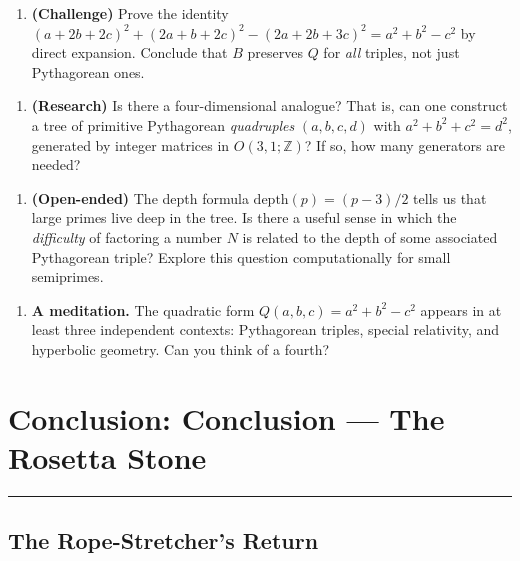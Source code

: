 \documentclass[11pt,openany]{book}
\theoremstyle{definition}
\theoremstyle{plain}
\theoremstyle{remark}
\begin{document}
\begin{enumerate}
\item \textbf{ (Challenge)} Prove the identity $(a + 2b + 2c)^2 + (2a + b + 2c)^2 - (2a + 2b + 3c)^2 = a^2 + b^2 - c^2$ by direct expansion. Conclude that $B$ preserves $Q$ for \textit{all} triples, not just Pythagorean ones.
\end{enumerate}

\begin{enumerate}
\item \textbf{ (Research)} Is there a four-dimensional analogue? That is, can one construct a tree of primitive Pythagorean \textit{quadruples} $(a, b, c, d)$ with $a^2 + b^2 + c^2 = d^2$, generated by integer matrices in $O(3,1; \mathbb{Z})$? If so, how many generators are needed?
\end{enumerate}

\begin{enumerate}
\item \textbf{ (Open-ended)} The depth formula $\text{depth}(p) = (p-3)/2$ tells us that large primes live deep in the tree. Is there a useful sense in which the \textit{difficulty} of factoring a number $N$ is related to the depth of some associated Pythagorean triple? Explore this question computationally for small semiprimes.
\end{enumerate}

\begin{enumerate}
\item \textbf{A meditation.} The quadratic form $Q(a, b, c) = a^2 + b^2 - c^2$ appears in at least three independent contexts: Pythagorean triples, special relativity, and hyperbolic geometry. Can you think of a fourth?
\end{enumerate}

\clearpage

\chapter*{Conclusion: Conclusion — The Rosetta Stone}


\bigskip\noindent\rule{\textwidth}{0.4pt}\bigskip


\section*{The Rope-Stretcher's Return}
\end{document}
